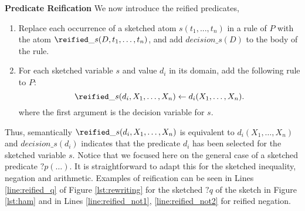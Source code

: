 \vspace{3pt}
\textbf{Predicate Reification} 
We now introduce the reified predicates, 
\begin{enumerate}
\item
Replace each occurrence of a sketched atom $s(t_1,...,t_n)$ in a rule of $P$ with the atom $\reified\_s( D, t_1, \dots, t_n)$, 
and add $\textit{decision}\_s(D)$ to the body of the rule.
\item
For each sketched variable $s$ and value $d_i$ in its domain, add the following rule to $P$: %
$$\reified\_s(d_i,X_1, \dots, X_n) \leftarrow d_i(X_1, \dots, X_n).$$
where the first argument is the decision variable for $s$.
\end{enumerate}
Thus, semantically $\reified\_s(d_i,X_1, \dots, X_n)$ is equivalent to $d_i(X_1, \dots, X_n)$  
and $\textit{decision}\_s(d_i)$ indicates that the predicate $d_i$ has been selected for the sketched variable $s$.
Notice that we focused here on the general case of a sketched predicate ${?}p(\dots)$. 
It is straightforward to adapt this for 
the sketched inequality, negation and arithmetic. Examples of reification can be seen in Lines \ref{line:reified_q} of Figure \ref{lst:rewriting} for the sketched ${?}q$ of the sketch in Figure \ref{lst:ham} and in Lines \ref{line:reified_not1}, \ref{line:reified_not2} for reified negation.

